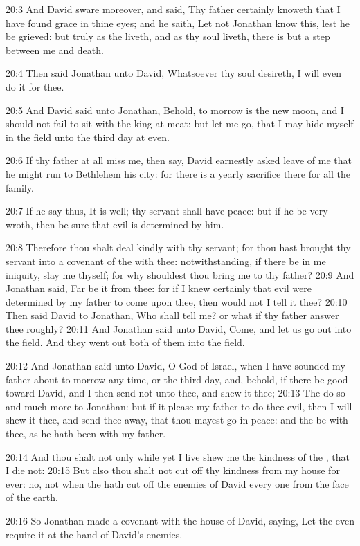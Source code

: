 20:3 And David sware moreover, and said, Thy father certainly knoweth
that I have found grace in thine eyes; and he saith, Let not Jonathan
know this, lest he be grieved: but truly as the \LORD liveth, and as
thy soul liveth, there is but a step between me and death.

20:4 Then said Jonathan unto David, Whatsoever thy soul desireth, I
will even do it for thee.

20:5 And David said unto Jonathan, Behold, to morrow is the new moon,
and I should not fail to sit with the king at meat: but let me go,
that I may hide myself in the field unto the third day at even.

20:6 If thy father at all miss me, then say, David earnestly asked
leave of me that he might run to Bethlehem his city: for there is a
yearly sacrifice there for all the family.

20:7 If he say thus, It is well; thy servant shall have peace: but if
he be very wroth, then be sure that evil is determined by him.

20:8 Therefore thou shalt deal kindly with thy servant; for thou hast
brought thy servant into a covenant of the \LORD with thee:
notwithstanding, if there be in me iniquity, slay me thyself; for why
shouldest thou bring me to thy father?  20:9 And Jonathan said, Far be
it from thee: for if I knew certainly that evil were determined by my
father to come upon thee, then would not I tell it thee?  20:10 Then
said David to Jonathan, Who shall tell me? or what if thy father
answer thee roughly?  20:11 And Jonathan said unto David, Come, and
let us go out into the field. And they went out both of them into the
field.

20:12 And Jonathan said unto David, O \LORD God of Israel, when I have
sounded my father about to morrow any time, or the third day, and,
behold, if there be good toward David, and I then send not unto thee,
and shew it thee; 20:13 The \LORD do so and much more to Jonathan: but
if it please my father to do thee evil, then I will shew it thee, and
send thee away, that thou mayest go in peace: and the \LORD be with
thee, as he hath been with my father.

20:14 And thou shalt not only while yet I live shew me the kindness of
the \LORD, that I die not: 20:15 But also thou shalt not cut off thy
kindness from my house for ever: no, not when the \LORD hath cut off
the enemies of David every one from the face of the earth.

20:16 So Jonathan made a covenant with the house of David, saying, Let
the \LORD even require it at the hand of David's enemies.

